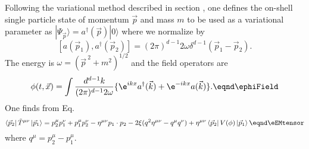 {}Following the variational method described in section
\ssNVarfiv, one defines the on-shell single particle state of
momentum $\vec p$ and mass $m$ to be used as a variational
parameter as $|\Psi_{\vec p}\rangle = a^\dagger (\vec p) |0\rangle
$ where we normalize by
$$ [a(\vec p_1), a^\dagger (\vec p_2)]=(2\pi)^{d-1}2\omega
\delta^{d-1}(\vec p_1-\vec p_2).$$ The energy is $\omega=(\vec
p^{~2}+m^2)^{1/2}$ and the field operators are
$$\phi(t,\vec x )=\int {d^{d-1}k\over (2\pi)^{d-1}2\omega}
\{\e^{ikx}a^\dagger(\vec k) + \e^{-ikx}a(\vec k) \}. \eqnd\ephiField
$$
 One finds from Eq.\energyMomentum
$$\left<\vec p_2\right|\tilde T^{\mu\nu} \left|\vec p_1\right>
= p_2^\mu p_1^\nu + p_1^\mu p_2^\nu -\eta^{\mu\nu} p_1\cdot p_2  -
2\xi(q^2 \eta^{\mu\nu}-q^\mu q^\nu) + \eta^{\mu\nu}\left<\vec
p_2\right|V(\phi)\left|\vec p_1\right> \eqnd\eEMtensor$$ where
$q^\mu=p_2^\mu-p_1^\mu$.

